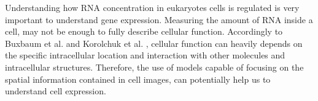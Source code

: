 
\glsresetall


Understanding how RNA concentration in eukaryotes cells is regulated is very important to understand gene expression. Measuring the amount of RNA inside a cell, may not be enough to fully describe cellular function. Accordingly to Buxbaum et al. \cite{Buxbaum_2014} and Korolchuk et al. \cite{Korolchuk2011}, cellular function can heavily depends on the specific intracellular location and interaction with other molecules and intracellular structures. Therefore, the use of models capable of focusing on the spatial information contained in cell images, can potentially help us to understand cell expression.
